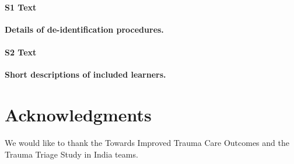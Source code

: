 \documentclass[10pt,letterpaper]{article}\usepackage[]{graphicx}\usepackage[]{color}
\begin{document}
\paragraph*{S1 Text}
\label{S1_Text}
{\bf Details of de-identification procedures.}

\paragraph*{S2 Text}
\label{S2_Text}
{\bf Short descriptions of included learners.}





\section*{Acknowledgments}
We would like to thank the Towards Improved Trauma Care Outcomes and the Trauma
Triage Study in India teams.

\nolinenumbers

%
%
% 

\end{document}
